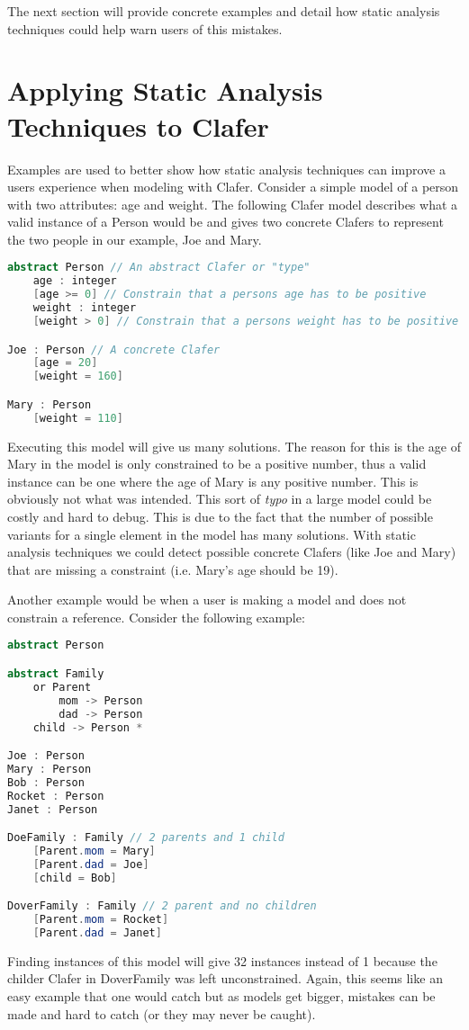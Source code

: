 \documentclass{article}
\begin{document}
The next section will provide concrete examples and detail how static analysis techniques could help warn users of this mistakes.
\section{Applying Static Analysis Techniques to Clafer}
Examples are used to better show how static analysis techniques can improve a users experience when modeling with Clafer. Consider a simple model of a person with two attributes: age and weight. The following Clafer model describes what a valid instance of a Person would be and gives two concrete Clafers to represent the two people in our example, Joe and Mary.

\begin{lstlisting}[language=Java, breaklines=true]
abstract Person // An abstract Clafer or "type"
    age : integer
    [age >= 0] // Constrain that a persons age has to be positive
    weight : integer
    [weight > 0] // Constrain that a persons weight has to be positive

Joe : Person // A concrete Clafer
    [age = 20]
    [weight = 160]

Mary : Person
    [weight = 110]
\end{lstlisting}

Executing this model will give us many solutions. The reason for this is the age of Mary in the model is only constrained to be a positive number, thus a valid instance can be one where the age of Mary is any positive number. This is obviously not what was intended. This sort of \textit{typo} in a large model could be costly and hard to debug. This is due to the fact that the number of possible variants for a single element in the model has many solutions. With static analysis techniques we could detect possible concrete Clafers (like Joe and Mary) that are missing a constraint (i.e. Mary's age should be 19).

Another example would be when a user is making a model and does not constrain a reference. Consider the following example:
\begin{lstlisting}[language=Java, breaklines=true]
abstract Person

abstract Family
    or Parent
        mom -> Person
        dad -> Person
    child -> Person *

Joe : Person
Mary : Person
Bob : Person
Rocket : Person
Janet : Person

DoeFamily : Family // 2 parents and 1 child
	[Parent.mom = Mary]
	[Parent.dad = Joe]
	[child = Bob]

DoverFamily : Family // 2 parent and no children
	[Parent.mom = Rocket]
	[Parent.dad = Janet]
\end{lstlisting}
Finding instances of this model will give 32 instances instead of 1 because the childer Clafer in DoverFamily was left unconstrained. Again, this seems like an easy example that one would catch but as models get bigger, mistakes can be made and hard to catch (or they may never be caught). 
\end{document}

